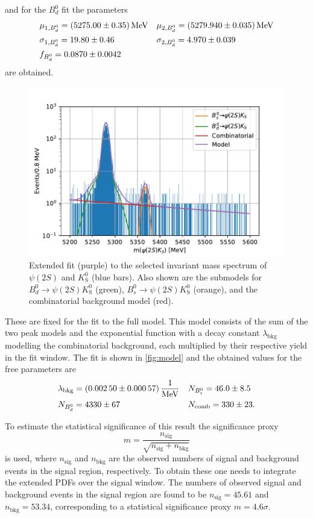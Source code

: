 and for the $B^0_d$ fit the parameters
\begin{align*}
  &\mu_{1, B^0_d} = \SI{5275.0 \pm 0.35}{\mega\eV} && \mu_{2, B^0_d} = \SI{5279.94 \pm 0.035}{\mega\eV}\\
  &\sigma_{1, B^0_d} = \num{19.8 \pm 0.46} && \sigma_{2, B^0_d} = \num{4.97 \pm 0.039}\\
  &f_{B^0_d} = \num{0.0870 \pm 0.0042}
\end{align*}
are obtained.

\begin{figure}[tb]
  \centering
  \includegraphics[width=12cm]{plots/data_fit_extended.pdf}
  \caption{Extended fit (purple) to the selected invariant mass spectrum of $\psi(2S)$ and $K^0_\mathrm{S}$ (blue bars). Also shown are the submodels for $B^0_d \to \psi(2S)K^0_\mathrm{S}$ (green), $B^0_s \to \psi(2S)K^0_\mathrm{S}$ (orange), and the combinatorial background model (red).}
  \label{fig:model}
\end{figure}

These are fixed for the fit to the full model. This model consists of the sum of the two peak models and the exponential function with a decay constant $\lambda_\mathrm{bkg}$ modelling the combinatorial background, each multiplied by their respective yield in the fit window. The fit is shown in \autoref{fig:model} and the obtained values for the free parameters are
\begin{align*}
  &\lambda_\mathrm{bkg} = \SI{0.0025 \pm 0.00057}{\per\mega\eV} && N_{B^0_s} = \num{46 \pm 8.5}\\
  &N_{B^0_d} = \num{4330 \pm 67} && N_\mathrm{comb} = \num{330 \pm 23}.
\end{align*}

To estimate the statistical significance of this result the significance proxy
\begin{equation*}
  m = \frac{n_\mathrm{sig}}{\sqrt{n_\mathrm{sig} + n_\mathrm{bkg}}}
\end{equation*}
is used, where $n_\mathrm{sig}$ and $n_\mathrm{bkg}$ are the observed numbers of signal and background events in the signal region, respectively. To obtain these one needs to integrate the extended PDFs over the signal window.
The numbers of observed signal and background events in the signal region are found to be $n_\mathrm{sig} = \num{45.61}$ and $n_\mathrm{bkg} = \num{53.34}$, corresponding to a statistical significance proxy $m =\num{4.6}\sigma$.
